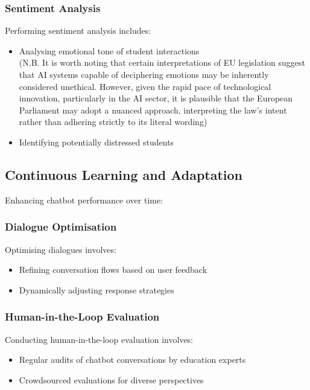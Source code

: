 \documentclass[15pt,a4paper]{article}
\begin{document}
\begin{multicols}{2}
\subsubsection*{Sentiment Analysis}
Performing sentiment analysis \textit{\parencite[pp. 50-100]{Liu2023}} includes:
\begin{itemize}
  \item Analysing emotional tone of student interactions\\ (N.B. It is worth noting that certain interpretations of EU legislation suggest that AI systems capable of deciphering emotions may be inherently considered unethical. However, given the rapid pace of technological innovation, particularly in the AI sector, it is plausible that the European Parliament may adopt a nuanced approach, interpreting the law's intent rather than adhering strictly to its literal wording) \textit{\parencite[pp. 150-175]{Dignum2023}}
    \item Identifying potentially distressed students
\end{itemize}

\subsection{Continuous Learning and Adaptation}
Enhancing chatbot performance over time:

\subsubsection*{Dialogue Optimisation}
Optimising dialogues \textit{\parencite[pp. 50-100]{Gao2023}} involves:
\begin{itemize}
    \item Refining conversation flows based on user feedback
    \item Dynamically adjusting response strategies
\end{itemize}

\subsubsection*{Human-in-the-Loop Evaluation}
Conducting human-in-the-loop evaluation \textit{\parencite[pp. 30-60]{Vaughan2024}} involves:
\begin{itemize}
    \item Regular audits of chatbot conversations by education experts
    \item Crowdsourced evaluations for diverse perspectives
\end{itemize}


\end{multicols}
\end{document}
